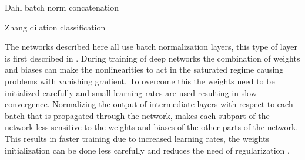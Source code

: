 Dahl
batch norm
concatenation




Zhang
dilation
classification









The networks described here all use batch normalization layers, this type of layer is first described in \cite{ioffe2015batch}. During training of deep networks the combination of weights and biases can make the nonlinearities to act in the saturated regime causing problems with vanishing gradient. To overcome this the weights need to be initialized carefully and small learning rates are used resulting in slow convergence. Normalizing the output of intermediate layers with respect to each batch that is propagated through the network, makes each subpart of the network less sensitive to the weights and biases of the other parts of the network. This results in faster training due to increased learning rates, the weights initialization can be done less carefully and reduces the need of regularization \cite{ioffe2015batch}.


